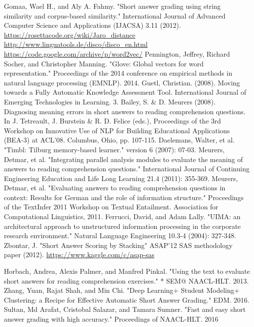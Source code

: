 \documentclass[11pt]{report}
\numberwithin{equation}{section} %
\begin{document}
\begin{thebibliography}{3}
 Gomaa, Wael H., and Aly A. Fahmy. "Short answer grading using string similarity and corpus-based similarity." International Journal of Advanced Computer Science and Applications (IJACSA) 3.11 (2012).
 \url{https://rosettacode.org/wiki/Jaro_distance}
 \url{http://www.linguatools.de/disco/disco_en.html}
 \url{https://code.google.com/archive/p/word2vec/}
 Pennington, Jeffrey, Richard Socher, and Christopher Manning. "Glove: Global vectors for word representation." Proceedings of the 2014 conference on empirical methods in natural language processing (EMNLP). 2014.
 Guetl, Christian. (2008). Moving towards a Fully Automatic Knowledge Assessment Tool. International Journal of Emerging Technologies in Learning. 3. 
 Bailey, S. \& D. Meurers (2008). Diagnosing meaning errors in short answers to reading comprehension questions. In J. Tetreault, J. Burstein \& R. D. Felice (eds.), Proceedings of the 3rd Workshop on Innovative Use of NLP for Building Educational Applications (BEA-3) at ACL'08. Columbus, Ohio, pp. 107-115.
 Daelemans, Walter, et al. "Timbl: Tilburg memory-based learner." version 6 (2007): 07-03.
 Meurers, Detmar, et al. "Integrating parallel analysis modules to evaluate the meaning of answers to reading comprehension questions." International Journal of Continuing Engineering Education and Life Long Learning 21.4 (2011): 355-369.
 Meurers, Detmar, et al. "Evaluating answers to reading comprehension questions in context: Results for German and the role of information structure." Proceedings of the TextInfer 2011 Workshop on Textual Entailment. Association for Computational Linguistics, 2011.
 Ferrucci, David, and Adam Lally. "UIMA: an architectural approach to unstructured information processing in the corporate research environment." Natural Language Engineering 10.3-4 (2004): 327-348.
 Zbontar, J. "Short Answer Scoring by Stacking" ASAP'12 SAS methodology paper (2012).
 \url{https://www.kaggle.com/c/asap-sas}



 Horbach, Andrea, Alexis Palmer, and Manfred Pinkal. "Using the text to evaluate short answers for reading comprehension exercises." * SEM@ NAACL-HLT. 2013.
 Zhang, Yuan, Rajat Shah, and Min Chi. "Deep Learning+ Student Modeling+ Clustering: a Recipe for Effective Automatic Short Answer Grading." EDM. 2016.
 Sultan, Md Arafat, Cristobal Salazar, and Tamara Sumner. "Fast and easy short answer grading with high accuracy." Proceedings of NAACL-HLT. 2016


\end{thebibliography}
\end{document}
